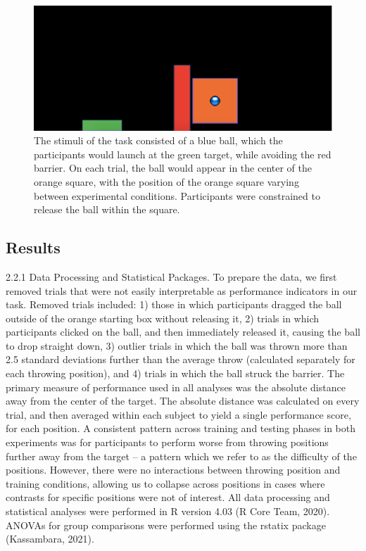 \documentclass[
  man,floatsintext]{apa7}
\begin{document}
\begin{figure}
\includegraphics[width=1\linewidth,height=1\textheight]{Assets/methodsFig1} \caption{The stimuli of the task consisted of a blue ball, which the participants would launch at the green target, while avoiding the red barrier. On each trial, the ball would appear in the center of the orange square, with the position of the orange square varying between experimental conditions. Participants were constrained to release the ball within the square.}\label{fig:Task}
\end{figure}

\hypertarget{results}{%
\subsection{Results}\label{results}}

2.2.1 Data Processing and Statistical Packages. To prepare the data, we first removed trials that were not easily interpretable as performance indicators in our task. Removed trials included: 1) those in which participants dragged the ball outside of the orange starting box without releasing it, 2) trials in which participants clicked on the ball, and then immediately released it, causing the ball to drop straight down, 3) outlier trials in which the ball was thrown more than 2.5 standard deviations further than the average throw (calculated separately for each throwing position), and 4) trials in which the ball struck the barrier.
The primary measure of performance used in all analyses was the absolute distance away from the center of the target. The absolute distance was calculated on every trial, and then averaged within each subject to yield a single performance score, for each position. A consistent pattern across training and testing phases in both experiments was for participants to perform worse from throwing positions further away from the target -- a pattern which we refer to as the difficulty of the positions. However, there were no interactions between throwing position and training conditions, allowing us to collapse across positions in cases where contrasts for specific positions were not of interest. All data processing and statistical analyses were performed in R version 4.03 (R Core Team, 2020). ANOVAs for group comparisons were performed using the rstatix package (Kassambara, 2021).
\end{document}
